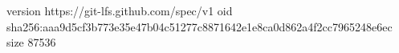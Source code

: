 version https://git-lfs.github.com/spec/v1
oid sha256:aaa9d5cf3b773e35e47b04c51277c8871642e1e8ca0d862a4f2cc7965248e6ec
size 87536
